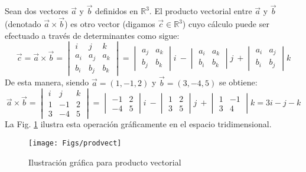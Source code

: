 Sean dos vectores $\vec{a}$ y $\vec{b}$ definidos en $\mathbb{R}^3$. El producto vectorial entre $\vec{a}$ y $\vec{b}$ (denotado $\vec{a} \times \vec{b}$) es otro vector (digamos $\vec{c} \in \mathbb{R}^3$) cuyo cálculo puede ser efectuado a través de determinantes como sigue:
\begin{equation}\label{defprodvect}
\vec{c} = \vec{a} \times \vec{b} = \begin{vmatrix}
i& j & k \\
a_i & a_j  & a_k \\
b_i & b_j  & b_k
\end{vmatrix} =
\begin{vmatrix}
 a_j & a_k \\
 b_j & b_k
\end{vmatrix}i~
-
\begin{vmatrix}
a_i & a_k \\
b_i & b_k
\end{vmatrix}j~
+\begin{vmatrix}
 a_i & a_j \\
 b_i & b_j
\end{vmatrix}k
\end{equation}
De esta manera, siendo $\vec{a}=(1,-1,2)$ y $\vec{b}=(3,-4,5)$ se obtiene:
\begin{equation}
\vec{a} \times \vec{b} =\begin{vmatrix}
i& j & k \\
1 &-1  &2 \\
3 &-4  &5
\end{vmatrix}=
\begin{vmatrix}
 -1&2 \\
 -4&5
\end{vmatrix}i~
-
\begin{vmatrix}
1 &2 \\
3 &5
\end{vmatrix}j~
+\begin{vmatrix}
 1&-1 \\
 3&4
\end{vmatrix}k
= 3i-j-k
\end{equation}
\noindent La Fig. \ref{prodvect} ilustra esta operación gráficamente en el espacio tridimensional.
\begin{figure}[h]
\centering
\caption[]{Ilustración gráfica para producto vectorial}\label{prodvect}
\texttt{[image: Figs/prodvect]}
\end{figure}

